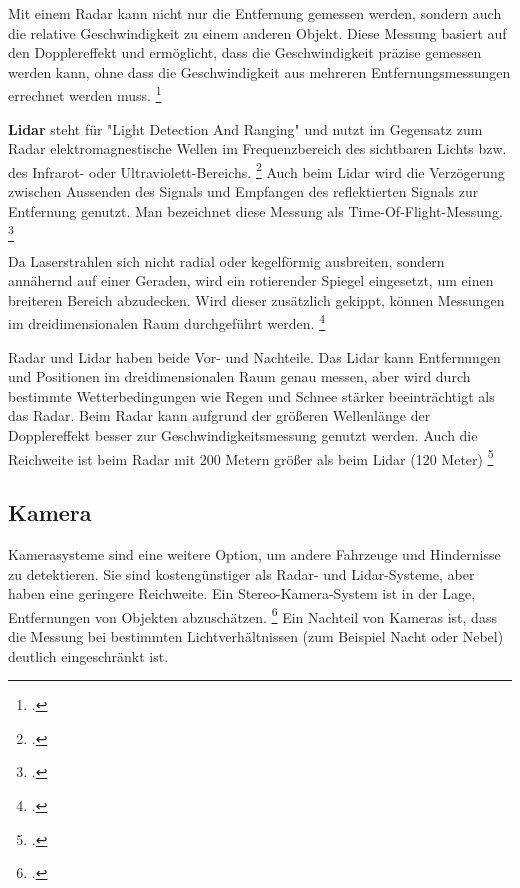 			Mit einem Radar kann nicht nur die Entfernung gemessen werden, sondern auch die relative Geschwindigkeit zu einem anderen Objekt. Diese Messung basiert auf den Dopplereffekt und ermöglicht, dass die Geschwindigkeit präzise gemessen werden kann, ohne dass die Geschwindigkeit aus mehreren Entfernungsmessungen errechnet werden muss. \footcite[Vgl.][]{Xu2014Doppler}
			
			\textbf{Lidar} steht für "Light Detection And Ranging" und nutzt im Gegensatz zum Radar elektromagnestische Wellen im Frequenzbereich des sichtbaren Lichts bzw. des Infrarot- oder Ultraviolett-Bereichs. \footcite[Vgl.][S. 318]{Winner2015Fahrerassistenz} Auch beim Lidar wird die Verzögerung zwischen Aussenden des Signals und Empfangen des reflektierten Signals zur Entfernung genutzt. Man bezeichnet diese Messung als Time-Of-Flight-Messung. \footcite[Vgl.][]{Ewald2000LaserObstacle}
			
			Da Laserstrahlen sich nicht radial oder kegelförmig ausbreiten, sondern annähernd auf einer Geraden, wird ein rotierender Spiegel eingesetzt, um einen breiteren Bereich abzudecken. Wird dieser zusätzlich gekippt, können Messungen im dreidimensionalen Raum durchgeführt werden. \footcite[Vgl.][]{Zhaohua2020RadarLidar}
			
			Radar und Lidar haben beide Vor- und Nachteile. Das Lidar kann Entfernungen und Positionen im dreidimensionalen Raum genau messen, aber wird durch bestimmte Wetterbedingungen wie Regen und Schnee stärker beeinträchtigt als das Radar. Beim Radar kann aufgrund der größeren Wellenlänge der Dopplereffekt besser zur Geschwindigkeitsmessung genutzt werden. Auch die Reichweite ist beim Radar mit 200 Metern größer als beim Lidar (120 Meter) \footcite[Vgl.][]{Zhaohua2020RadarLidar}
		\subsection{Kamera}
		Kamerasysteme sind eine weitere Option, um andere Fahrzeuge und Hindernisse zu detektieren. Sie sind kostengünstiger als Radar- und Lidar-Systeme, aber haben eine geringere Reichweite. Ein Stereo-Kamera-System ist in der Lage, Entfernungen von Objekten abzuschätzen. \footcite[Vgl.][]{Tsai2018StereoVision} Ein Nachteil von Kameras ist, dass die Messung bei bestimmten Lichtverhältnissen (zum Beispiel Nacht oder Nebel) deutlich eingeschränkt ist.
